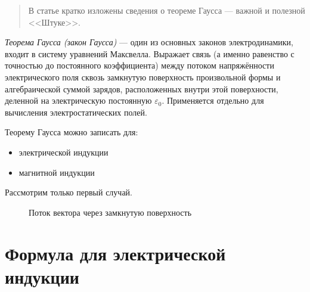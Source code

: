 \documentclass{amcs}
\begin{document}
\newcommand{\vect}[1]{\boldsymbol{\mathbf{#1}}}

\maketitlepage

\begin{abstract}
  В статье кратко изложены сведения о теореме Гаусса --- важной и полезной <<Штуке>>.
\end{abstract}

\tableofcontents


\emph{Теорема Гаусса (закон Гаусса)} --- один из основных законов электродинамики, входит в систему уравнений Максвелла. Выражает связь (а именно равенство с точностью до постоянного коэффициента) между потоком напряжённости электрического поля сквозь замкнутую поверхность произвольной формы и алгебраической суммой зарядов, расположенных внутри этой поверхности, деленной на электрическую постоянную $\varepsilon_0$. Применяется отдельно для вычисления электростатических полей.

Теорему Гаусса можно записать для:
\begin{itemize}
\item{электрической индукции}
\item{магнитной индукции}
\end{itemize}

Рассмотрим только первый случай.

\begin{figure}[bh]
    \noindent
    \caption{Поток вектора через замкнутую поверхность}
    \label{figCurves}
\end{figure}

\section{Формула для электрической индукции}
\end{document}

